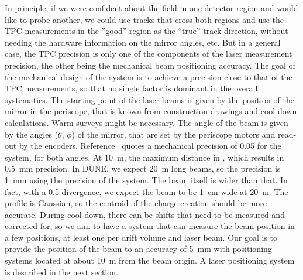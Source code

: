 In principle, if we were confident about the field in one detector region and would like to probe another, we could use tracks that cross both regions and use the TPC measurements in the ''good'' region as the ``true'' track direction, without needing the hardware information on the mirror angles, etc. But in a general case, the TPC precision is only one of the components of the laser measurement precision, the other being the mechanical beam positioning accuracy. The goal of the mechanical design of the system is to achieve a precision close to that of the TPC measurements, so that no single factor is dominant in the overall systematics. The starting point of the laser beams is given by the position of the mirror in the periscope, that is known from construction drawings and cool down calculations. Warm surveys might be necessary. The angle of the beam is given by the angles ($\theta$, $\phi$) of the mirror, that are set by the periscope motors and read-out by the encoders. 
Reference~\cite{bib:chen2018} quotes a mechanical precision of \SI{0.05}{\mrad} for the  system, for both angles. At \SI{10}{\m}, the maximum distance in , 
which results in \SI{0.5}{\milli\m} precision. In DUNE, we 
expect \SI{20}{\m} long beams, so the precision is \SI{1}{\milli\m} 
using the precision of the  system. The beam itself is wider than that. In fact, with a \SI{0.5}{\mrad} divergence, we expect the beam to be \SI{1}{\cm} wide at \SI{20}{\m}. The profile is Gaussian, so the centroid of the charge creation should be more accurate. During cool down, there can be shifts that need to be measured and corrected for, so we aim to have a system that can measure the beam position in a few positions, at least one per drift volume and laser beam. Our goal is to provide the position of the beam to an accuracy of \SI{5}{\milli\m} with positioning systems located at about \SI{10}{\m} from the beam origin. A laser positioning system is described in the next section.

 
 


